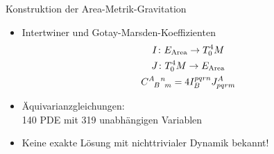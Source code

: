 \documentclass{beamer}
\newcommand{\gmc}[4]{\ensuremath{C^{#1\hphantom{#2}#3}_{\hphantom{#1}{#2}\hphantom{#3}#4}}}
\begin{document}
    \begin{frame}{Konstruktion der Area-Metrik-Gravitation}
        \begin{itemize}
            \item Intertwiner und Gotay-Marsden-Koeffizienten
            \begin{gather*}
                I \colon E_\text{Area} \rightarrow T^4_0 M \\
                J  \colon T^4_0 M \rightarrow E_\text{Area} \\
                \gmc{A}{B}{n}{m} = 4 I^{pqrn}_B J_{pqrm}^A
            \end{gather*}
            \item Äquivarianzgleichungen: \\
            140 PDE mit 319 unabhängigen Variablen
            \item Keine exakte Lösung mit nichttrivialer Dynamik bekannt!
        \end{itemize}
    \end{frame}
\end{document}
